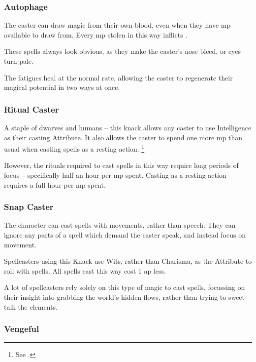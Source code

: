 \begin{multicols}{2}

\subsubsection{Autophage}

The caster can draw magic from their own blood, even when they have \gls{mp} available to draw from.
Every \gls{mp} stolen in this way inflicts .

These spells always look obvious, as they make the caster's nose bleed, or eyes turn pale.

The \glspl{fatigue} heal at the normal rate, allowing the caster to regenerate their magical potential in two ways at once.


\subsubsection{Ritual Caster}
\label{ritualCaster}

A staple of dwarves and humans -- this knack allows any caster to use Intelligence as their casting Attribute.
It also allows the caster to spend one more \gls{mp} than usual when casting spells as a resting action.%
\footnote{See .}

However, the rituals required to cast spells in this way require long periods of focus -- specifically half an hour per \gls{mp} spent.
Casting as a resting action requires a full hour per \gls{mp} spent.

\subsubsection{Snap Caster}
\label{snapCaster}

The character can cast spells with movements, rather than speech.
They can ignore any parts of a spell which demand the caster speak, and instead focus on movement.

Spellcasters using this Knack use Wits, rather than Charisma, as the Attribute to roll with spells.
All spells cast this way cost 1 \gls{ap} less.

A lot of spellcasters rely solely on this type of magic to cast spells, focussing on their insight into grabbing the world's hidden flows, rather than trying to sweet-talk the elements.

\subsubsection{Vengeful}


\end{multicols}
